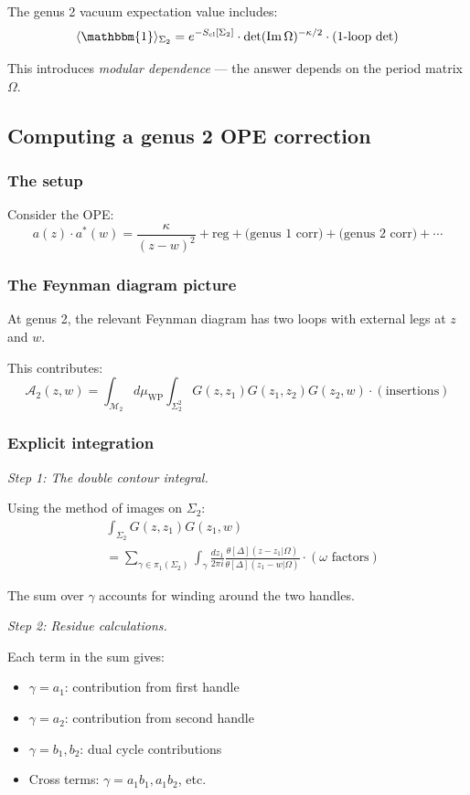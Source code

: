 The genus 2 vacuum expectation value includes:
\[\langle \mathbbm{1} \rangle_{\Sigma_2} = e^{-S_{\text{cl}}[\Sigma_2]}
\cdot \det(\operatorname{Im} \Omega)^{-\kappa/2} \cdot (\text{1-loop det})\]

This introduces \emph{modular dependence} --- the answer depends on the period
matrix $\Omega$.

\subsection{Computing a genus 2 OPE correction}

\subsubsection{The setup}

Consider the OPE:
\[a(z) \cdot a^*(w) = \frac{\kappa}{(z-w)^2} + \text{reg} 
+ \text{(genus 1 corr)} + \text{(genus 2 corr)} + \cdots\]

\subsubsection{The Feynman diagram picture}

At genus 2, the relevant Feynman diagram has two loops with external legs at $z$ and $w$.

This contributes:
\[\mathcal{A}_2(z,w) = \int_{\mathcal{M}_2} d\mu_{\text{WP}} 
\int_{\Sigma_2^2} G(z, z_1) G(z_1, z_2) G(z_2, w) \cdot (\text{insertions})\]

\subsubsection{Explicit integration}

\emph{Step 1: The double contour integral.}

Using the method of images on $\Sigma_2$:
\begin{align}
&\int_{\Sigma_2} G(z, z_1) G(z_1, w) \\
&= \sum_{\gamma \in \pi_1(\Sigma_2)} 
\int_{\gamma} \frac{dz_1}{2\pi i} 
\frac{\theta[\Delta](z - z_1 | \Omega)}{\theta[\Delta](z_1 - w | \Omega)} 
\cdot (\omega \text{ factors})
\end{align}

The sum over $\gamma$ accounts for winding around the two handles.

\emph{Step 2: Residue calculations.}

Each term in the sum gives:
\begin{itemize}
\item $\gamma = a_1$: contribution from first handle
\item $\gamma = a_2$: contribution from second handle  
\item $\gamma = b_1, b_2$: dual cycle contributions
\item Cross terms: $\gamma = a_1 b_1, a_1 b_2$, etc.
\end{itemize}

